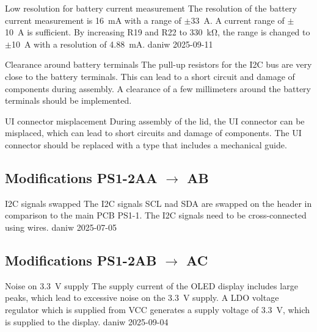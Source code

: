 \begin{ModTable}
\ModItemDone
{Low resolution for battery current measurement}
{The resolution of the battery current measurement is \qty{16}{\milli\ampere} with a range of $\pm$\qty{33}{\ampere}. A current range of $\pm$\qty{10}{\ampere} is sufficient. }
{By increasing R19 and R22 to \qty{330}{\kilo\ohm}, the range is changed to $\pm$\qty{10}{\ampere} with a resolution of \qty{4.88}{\milli\ampere}. }
{daniw}
{2025-09-11}

\ModItemOpen
{Clearance around battery terminals}
{The pull-up resistors for the I2C bus are very close to the battery terminals. This can lead to a short circuit and damage of components during assembly. }
{A clearance of a few millimeters around the battery terminals should be implemented. }
{}
{}

\ModItemOpen
{\acs{UI} connector misplacement}
{During assembly of the lid, the \ac{UI} connector can be misplaced, which can lead to short circuits and damage of components. }
{The \ac{UI} connector should be replaced with a type that includes a mechanical guide. }
{}
{}

\end{ModTable}

\FloatBarrier

\subsection{Modifications PS1-2AA $\to$ AB}

\begin{ModTable}

\ModItemDone
{\acs{I2C} signals swapped}
{The \ac{I2C} signals SCL nad SDA are swapped on the header in comparison to the main PCB PS1-1. }
{The \ac{I2C} signals need to be cross-connected using wires. }
{daniw}
{2025-07-05}

\end{ModTable}

\FloatBarrier

\subsection{Modifications PS1-2AB $\to$ AC}

\begin{ModTable}

\ModItemDone
{Noise on \qty{3.3}{\volt} supply}
{The supply current of the \ac{OLED} display includes large peaks, which lead to excessive noise on the \qty{3.3}{\volt} supply. }
{A \ac{LDO} voltage regulator which is supplied from VCC generates a supply voltage of \qty{3.3}{\volt}, which is supplied to the display. }
{daniw}
{2025-09-04}

\end{ModTable}

